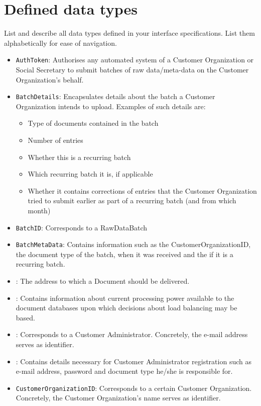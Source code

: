 \section{Defined data types}\label{app:datatypes}
List and describe all data types defined in your interface specifications. List
them alphabetically for ease of navigation.

\begin{itemize}
	\item \texttt{AuthToken}: Authorises any automated system of a Customer Organization or Social Secretary to submit batches of raw data/meta-data on the Customer Organization's behalf.
	\item \texttt{BatchDetails}: Encapsulates details about the batch a Customer Organization intends to upload. Examples of such details are:
	\begin{itemize}
		\item Type of documents contained in the batch
		\item Number of entries
		\item Whether this is a recurring batch
		\item Which recurring batch it is, if applicable
		\item Whether it contains corrections of entries that the Customer Organization tried to submit earlier as part of a recurring batch (and from which month)
	\end{itemize}
	\item \texttt{BatchID}: Corresponds to a RawDataBatch
	\item \texttt{BatchMetaData}: Contains information such as the CustomerOrganizationID, the document type of the batch, when it was received and the  if it is a recurring batch.
	\item {}: The address to which a Document should be delivered.
	\item {}: Contains information about current processing power available to the document databases upon which decisions about load balancing may be based.
	\item {}: Corresponds to a Customer Administrator. Concretely, the e-mail address serves as identifier.
	\item {}: Contains details necessary for Customer Administrator registration such as e-mail address, password and document type he/she is responsible for.
	\item \texttt{CustomerOrganizationID}: Corresponds to a certain Customer Organization. Concretely, the Customer Organization's name serves as identifier.

\end{itemize}
